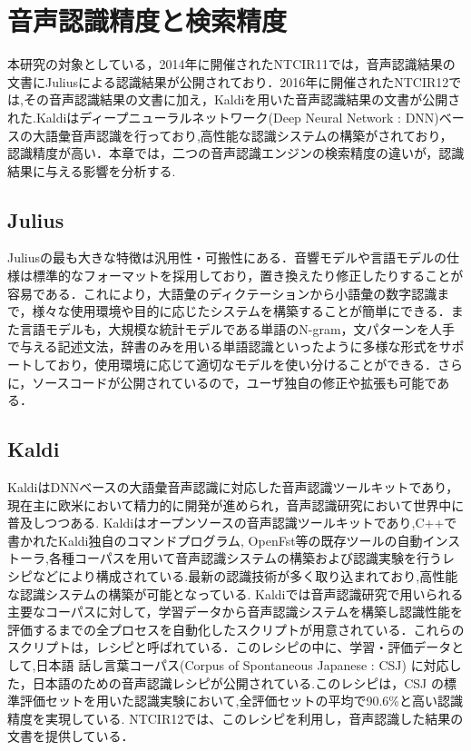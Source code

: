 \chapter{音声認識精度と検索精度}
本研究の対象としている，2014年に開催されたNTCIR11では，音声認識結果の文書にJulius\cite{julius}による認識結果が公開されており．2016年に開催されたNTCIR12では,その音声認識結果の文書に加え，Kaldiを用いた音声認識結果の文書が公開された.Kaldiはディープニューラルネットワーク(Deep Neural Network : DNN)ベースの大語彙音声認識を行っており,高性能な認識システムの構築がされており，認識精度が高い．本章では，二つの音声認識エンジンの検索精度の違いが，認識結果に与える影響を分析する.


\section{Julius}
Juliusの最も大きな特徴は汎用性・可搬性にある．音響モデルや言語モデルの仕様は標準的なフォーマットを採用しており，置き換えたり修正したりすることが容易である．これにより，大語彙のディクテーションから小語彙の数字認識まで，様々な使用環境や目的に応じたシステムを構築することが簡単にできる．また言語モデルも，大規模な統計モデルである単語のN-gram，文パターンを人手で与える記述文法，辞書のみを用いる単語認識といったように多様な形式をサポートしており，使用環境に応じて適切なモデルを使い分けることができる．さらに，ソースコードが公開されているので，ユーザ独自の修正や拡張も可能である．

\section{Kaldi}
Kaldi\cite{kaldi}はDNNベースの大語彙音声認識に対応した音声認識ツールキットであり，現在主に欧米において精力的に開発が進められ，音声認識研究において世界中に普及しつつある. Kaldiはオープンソースの音声認識ツールキットであり,C++で書かれたKaldi独自のコマンドプログラム, OpenFst等の既存ツールの自動インストーラ,各種コーパスを用いて音声認識システムの構築および認識実験を行うレシピなどにより構成されている.最新の認識技術が多く取り込まれており,高性能な認識システムの構築が可能となっている.
Kaldiでは音声認識研究で用いられる主要なコーパスに対して，学習データから音声認識システムを構築し認識性能を評価するまでの全プロセスを自動化したスクリプトが用意されている．これらのスクリプトは，レシピと呼ばれている．このレシピの中に、学習・評価データとして,日本語 話し言葉コーパス(Corpus of Spontaneous Japanese : CSJ) \cite{csj} に対応した，日本語のための音声認識レシピが公開されている.このレシピは，CSJ の標準評価セットを用いた認識実験において,全評価セットの平均で90.6\%と高い認識精度を実現している. NTCIR12では、このレシピを利用し，音声認識した結果の文書を提供している．



